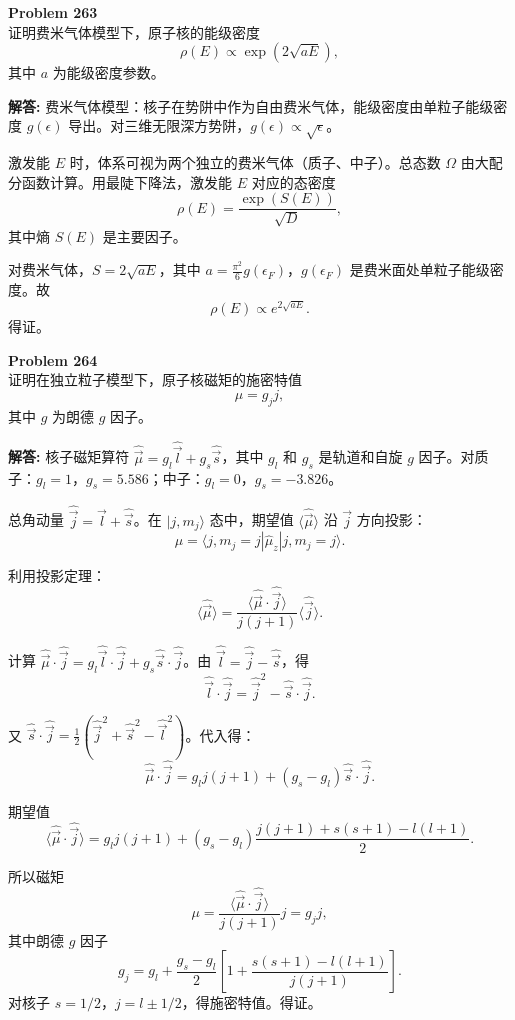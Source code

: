 \documentclass[12pt, a4paper, oneside]{ctexart}
\newenvironment{solution}{\par\noindent\textbf{解答:}\quad}{\par}
\begin{document}
\begin{mdframed}[backgroundcolor=gray!10, linewidth=0pt]
    \textbf{Problem 263} \\
    证明费米气体模型下，原子核的能级密度
    \[
    \rho(E) \propto \exp(2\sqrt{aE}),
    \]
    其中 $a$ 为能级密度参数。
\end{mdframed}
\begin{solution}
    费米气体模型：核子在势阱中作为自由费米气体，能级密度由单粒子能级密度 $g(\epsilon)$ 导出。对三维无限深方势阱，$g(\epsilon) \propto \sqrt{\epsilon}$。

    激发能 $E$ 时，体系可视为两个独立的费米气体（质子、中子）。总态数 $\Omega$ 由大配分函数计算。用最陡下降法，激发能 $E$ 对应的态密度
    \[
    \rho(E) = \frac{\exp(S(E))}{\sqrt{D}},
    \]
    其中熵 $S(E)$ 是主要因子。

    对费米气体，$S = 2\sqrt{aE}$，其中 $a = \frac{\pi^2}{6} g(\epsilon_F)$，$g(\epsilon_F)$ 是费米面处单粒子能级密度。故
    \[
    \rho(E) \propto e^{2\sqrt{aE}}.
    \]
    得证。
\end{solution}

\begin{mdframed}[backgroundcolor=gray!10, linewidth=0pt]
    \textbf{Problem 264} \\
    证明在独立粒子模型下，原子核磁矩的施密特值
    \[
    \mu = g_j j,
    \]
    其中 $g$ 为朗德 $g$ 因子。
\end{mdframed}
\begin{solution}
    核子磁矩算符 $\hat{\vec{\mu}} = g_l \hat{\vec{l}} + g_s \hat{\vec{s}}$，其中 $g_l$ 和 $g_s$ 是轨道和自旋 $g$ 因子。对质子：$g_l = 1$，$g_s = 5.586$；中子：$g_l = 0$，$g_s = -3.826$。

    总角动量 $\hat{\vec{j}} = \hat{\vec{l}} + \hat{\vec{s}}$。在 $|j, m_j\rangle$ 态中，期望值 $\langle \hat{\vec{\mu}} \rangle$ 沿 $\vec{j}$ 方向投影：
    \[
    \mu = \langle j, m_j=j | \hat{\mu}_z | j, m_j=j \rangle.
    \]

    利用投影定理：
    \[
    \langle \hat{\vec{\mu}} \rangle = \frac{\langle \hat{\vec{\mu}} \cdot \hat{\vec{j}} \rangle}{j(j+1)} \langle \hat{\vec{j}} \rangle.
    \]

    计算 $\hat{\vec{\mu}} \cdot \hat{\vec{j}} = g_l \hat{\vec{l}} \cdot \hat{\vec{j}} + g_s \hat{\vec{s}} \cdot \hat{\vec{j}}$。由 $\hat{\vec{l}} = \hat{\vec{j}} - \hat{\vec{s}}$，得
    \[
    \hat{\vec{l}} \cdot \hat{\vec{j}} = \hat{\vec{j}}^2 - \hat{\vec{s}} \cdot \hat{\vec{j}}.
    \]

    又 $\hat{\vec{s}} \cdot \hat{\vec{j}} = \frac{1}{2} (\hat{\vec{j}}^2 + \hat{\vec{s}}^2 - \hat{\vec{l}}^2)$。代入得：
    \[
    \hat{\vec{\mu}} \cdot \hat{\vec{j}} = g_l j(j+1) + (g_s - g_l) \hat{\vec{s}} \cdot \hat{\vec{j}}.
    \]

    期望值
    \[
    \langle \hat{\vec{\mu}} \cdot \hat{\vec{j}} \rangle = g_l j(j+1) + (g_s - g_l) \frac{j(j+1) + s(s+1) - l(l+1)}{2}.
    \]

    所以磁矩
    \[
    \mu = \frac{\langle \hat{\vec{\mu}} \cdot \hat{\vec{j}} \rangle}{j(j+1)} j = g_j j,
    \]
    其中朗德 $g$ 因子
    \[
    g_j = g_l + \frac{g_s - g_l}{2} \left[ 1 + \frac{s(s+1) - l(l+1)}{j(j+1)} \right].
    \]
    对核子 $s=1/2$，$j=l\pm1/2$，得施密特值。得证。
\end{solution}
\end{document}
